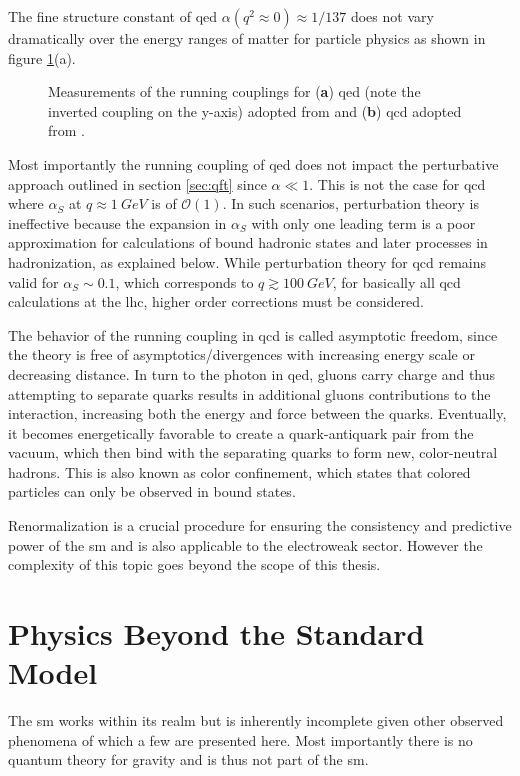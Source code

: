 The fine structure constant of \ac{qed} $\alpha(q^2\approx 0)\approx 1/137$ does not vary dramatically over the energy ranges of matter for particle physics as shown in figure \ref{fig:renorm_scaling_exp}(a).
\begin{figure}
    \centering
    \hspace{5mm}
    \caption[]{Measurements of the running couplings for (\textbf{a}) \ac{qed} (note the inverted coupling on the y-axis) adopted from \citep{opal2004tests} and (\textbf{b}) \ac{qcd} adopted from \citep{particle2022review}.}
    \label{fig:renorm_scaling_exp}
\end{figure}
Most importantly the running coupling of \ac{qed} does not impact the perturbative approach outlined in section \ref{sec:qft} since $\alpha\ll1$. This is not the case for \ac{qcd} where $\alpha_S$ at $q\approx\qty{1}{GeV}$ is of $\mathcal{O}(1)$. In such scenarios, perturbation theory is ineffective because the expansion in $\alpha_S$ with only one leading term is a poor approximation for calculations of bound hadronic states and later processes in hadronization, as explained below. While perturbation theory for \ac{qcd} remains valid for $\alpha_S\sim  0.1$, which corresponds to $q\gtrsim \qty{100}{GeV}$, for basically all \ac{qcd} calculations at the \ac{lhc}, higher order corrections must be considered.

The behavior of the running coupling in \ac{qcd} is called asymptotic freedom, since the theory is free of asymptotics/divergences with increasing energy scale or decreasing distance. In turn to the photon in \ac{qed}, gluons carry charge and thus attempting to separate quarks results in additional gluons contributions to the interaction, increasing both the energy and force between the quarks. Eventually, it becomes energetically favorable to create a quark-antiquark pair from the vacuum, which then bind with the separating quarks to form new, color-neutral hadrons. This is also known as color confinement, which states that colored particles can only be observed in bound states.

Renormalization is a crucial procedure for ensuring the consistency and predictive power of the \ac{sm} and is also applicable to the electroweak sector. However the complexity of this topic goes beyond the scope of this thesis.


\section{Physics Beyond the Standard Model}\label{sec:beyond_sm}
The \ac{sm} works within its realm but is inherently incomplete given other observed phenomena of which a few are presented here. Most importantly there is no quantum theory for gravity and is thus not part of the \ac{sm}.

